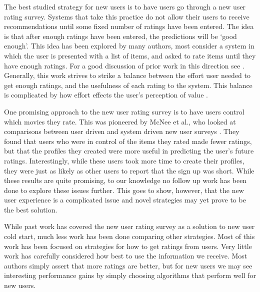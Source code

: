 \documentclass[letterpaper]{sig-alternate}
\begin{document}
  The best studied strategy for new users is to have users go through a new user rating survey.
  Systems that take this practice do not allow their users to receive recommendations until some fixed number of ratings have been entered.
  The idea is that after enough ratings have been entered, the predictions will be `good enough'.
  This idea has been explored by many authors, most consider a system in which the user is presented with a list of items, and asked to rate items until they have enough ratings.
  For a good discussion of prior work in this direction see \cite{adaptiveBootstrapping}.
  Generally, this work strives to strike a balance between the effort user needed to get enough ratings, and the usefulness of each rating to the system.
  This balance is complicated by how effort effects the user's perception of value \cite{TenIsEnough}.

  One promising approach to the new user rating survey is to have users control which movies they rate.
  This was pioneered by McNee et al., who looked at comparisons between user driven and system driven new user surveys \cite{mcneeInterfaces}.
  They found that users who were in control of the items they rated made fewer ratings, but that the profiles they created were more useful in predicting the user's future ratings.
  Interestingly, while these users took more time to create their profiles, they were just as likely as other users to report that the sign up was short.
  While these results are quite promising, to our knowledge no follow up work has been done to explore these issues further.
  This goes to show, however, that the new user experience is a complicated issue and novel strategies may yet prove to be the best solution.


  While past work has covered the new user rating survey as a solution to new user cold start, much less work has been done comparing other strategies.
  Most of this work has been focused on strategies for how to get ratings from users.
  Very little work has carefully considered how best to use the information we receive.
  Most authors simply assert that more ratings are better, but for new users we may see interesting performance gains by simply choosing algorithms that perform well for new users.
\end{document}
